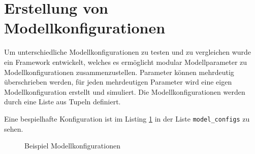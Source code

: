 


\section{Erstellung von Modellkonfigurationen}

Um unterschiedliche Modellkonfigurationen zu testen und zu vergleichen wurde ein Framework entwickelt, welches es ermöglicht modular Modellparameter zu Modellkonfigurationen zusammenzustellen. Parameter können mehrdeutig überschrieben werden, für jeden mehrdeutigen Parameter wird eine eigen Modellkonfiguration erstellt und simuliert. Die Modellkonfigurationen werden durch eine Liste aus Tupeln definiert. 

Eine bespielhafte Konfiguration ist im Listing \ref{conf} in der Liste \texttt{model\_configs} zu sehen.

\lstset{basicstyle=\ttfamily, numbers=left, numberstyle = \tiny, stepnumber = 2}

\begin{figure}
	\label{conf}
	\caption{Beispiel Modellkonfigurationen}
	
\end{figure}

